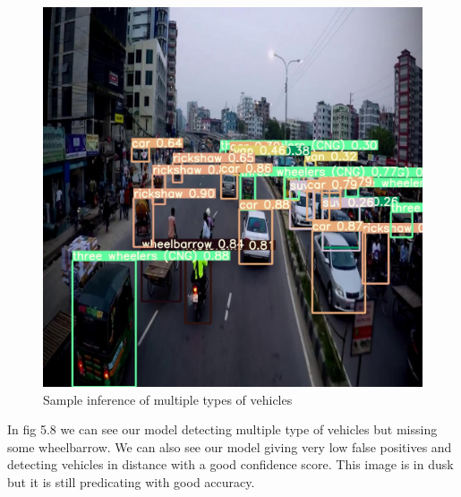 \begin{figure}[h]
    \centering
    \includegraphics[max width=\textwidth]{images/ours/3 (2).jpg}
   \caption{ Sample inference of multiple types of vehicles}
    \label{fig:inference875}
\end{figure}

In fig 5.8 we can see our model detecting multiple type of vehicles but missing some wheelbarrow. We can also see our model giving very low false positives and detecting vehicles in distance with a good confidence score. This image is in dusk but it is still predicating with good accuracy.

\newpage

